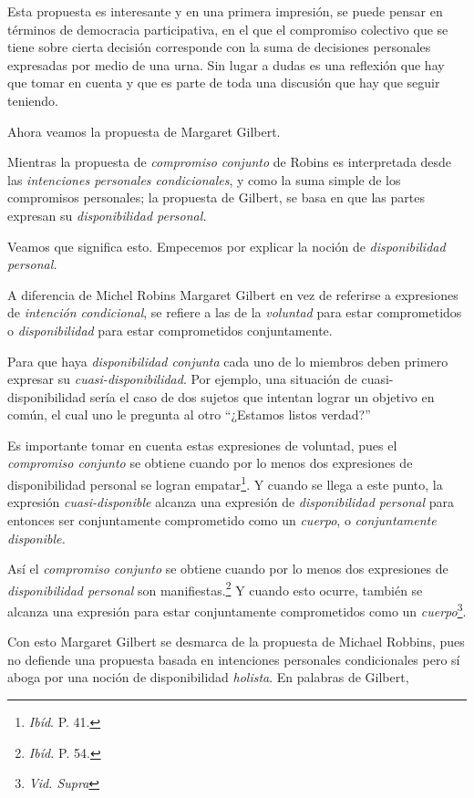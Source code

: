 \documentclass[oneside]{book}
\begin{document}
Esta propuesta es interesante y en una primera impresión, se puede pensar en términos de democracia participativa, en el que el compromiso colectivo que se tiene sobre cierta decisión corresponde con la suma de decisiones personales expresadas por medio de una urna. Sin lugar a dudas es una reflexión que hay que tomar en cuenta y que es parte de toda una discusión que hay que seguir teniendo.

Ahora veamos la propuesta de Margaret Gilbert.

Mientras la propuesta de \textit{compromiso conjunto} de Robins es interpretada desde las \textit{intenciones personales condicionales}, y como la suma simple de los compromisos personales; la propuesta de Gilbert, se basa en que las partes expresan su \textit{disponibilidad personal.}

Veamos que significa esto. Empecemos por explicar la noción de \textit{disponibilidad personal.}

A diferencia de Michel Robins Margaret Gilbert en vez de referirse a expresiones de \textit{intención condicional}, se refiere a las de la \textit{voluntad} para estar comprometidos o \textit{disponibilidad} para estar comprometidos conjuntamente.

Para que haya \textit{disponibilidad conjunta} cada uno de lo miembros deben primero expresar su \textit{cuasi-disponibilidad}.	Por ejemplo,  una situación de cuasi-disponibilidad sería el caso de dos sujetos que intentan lograr un objetivo en común, el cual uno le pregunta al otro “¿Estamos listos verdad?”

Es importante tomar en cuenta estas expresiones de voluntad, pues el \textit{compromiso conjunto} se obtiene cuando por lo menos dos expresiones de disponibilidad personal se logran empatar\footnote{\textit{Ibíd}. P. 41.}. Y cuando se llega a este punto, la expresión \textit{cuasi-disponible} alcanza una expresión de \textit{disponibilidad personal} para entonces ser conjuntamente comprometido como un \textit{cuerpo}, o \textit{conjuntamente disponible.}

Así el \textit{compromiso conjunto} se obtiene cuando por lo menos dos expresiones de \textit{disponibilidad personal} son manifiestas.\footnote{\textit{Ibíd.} P. 54.} Y cuando esto ocurre, también se alcanza una expresión para estar conjuntamente comprometidos como un \textit{cuerpo}\footnote{\textit{Vid. Supra}}.

Con esto Margaret Gilbert se desmarca de la propuesta de Michael Robbins, pues no defiende una propuesta basada en intenciones personales condicionales pero sí aboga por una noción de disponibilidad \textit{holista}.
En palabras de Gilbert,
\end{document}
